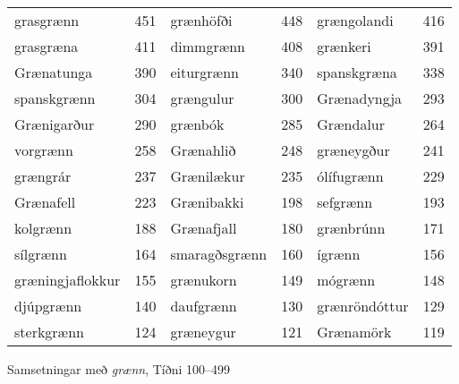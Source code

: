 \documentclass[../samsetningasafn.tex]{subfiles}
\begin{document}
\begin{wordlist}[H]
\begin{tcolorbox}

	\setlength{\extrarowheight}{3pt}
	\begin{tabular}{BlBlBl}
		grasgrænn		& 451		& 
		grænhöfði		& 448		& 	
		grængolandi		& 416		\\ 	
		grasgræna		& 411		& 
		dimmgrænn		& 408		& 		
		grænkeri			& 391		\\ 
		Grænatunga		& 390		& 	
		eiturgrænn		& 340		& 	
		spanskgræna		& 338		\\ 	
		spanskgrænn		& 304		& 		
		grængulur		& 300		& 
		Grænadyngja		& 293		\\ 	
		Grænigarður		& 290		& 	
		grænbók			& 285		& 	
		Grændalur		& 264		\\ 	
		vorgrænn			& 258		& 	
		Grænahlið		& 248		& 
		græneygður		& 241		\\ 	
		grængrár			& 237		& 
		Grænilækur		& 235		& 	
		ólífugrænn		& 229		\\ 
		Grænafell			& 223		& 
		Grænibakki		& 198		& 
		sefgrænn			& 193		\\ 
		kolgrænn			& 188		& 
		Grænafjall		& 180		& 
		grænbrúnn		& 171		\\ 
		sílgrænn			& 164		& 	
		smaragðsgrænn	& 160		& 	
		ígrænn			& 156		\\ 
		græningjaflokkur	& 155		& 
		grænukorn		& 149		& 
		mógrænn			& 148		\\ 
		djúpgrænn		& 140		& 
		daufgrænn		& 130		& 
		grænröndóttur		& 129		\\ 
		sterkgrænn		& 124		& 
		græneygur		& 121		& 
		Grænamörk		& 119		 
	\end{tabular}

\end{tcolorbox}
	\caption{Samsetningar með \textit{grænn}, Tíðni 100--499}
	\label{listi:graenn.100}
\end{wordlist}
		
\end{document}
